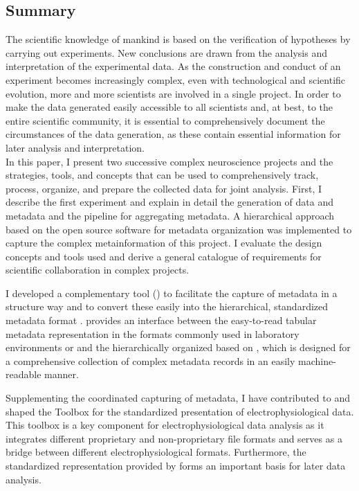 \clearpage
\thispagestyle{empty}
\subsection*{Summary}
\label{sec:summary}
The scientific knowledge of mankind is based on the verification of hypotheses by carrying out experiments. New conclusions are drawn from the analysis and interpretation of the experimental data. As the construction and conduct of an experiment becomes increasingly complex, even with technological and scientific evolution, more and more scientists are involved in a single project. In order to make the data generated easily accessible to all scientists and, at best, to the entire scientific community, it is essential to comprehensively document the circumstances of the data generation, as these contain essential information for later analysis and interpretation.\\

In this paper, I present two successive complex neuroscience projects and the strategies, tools, and concepts that can be used to comprehensively track, process, organize, and prepare the collected data for joint analysis. First, I describe the first experiment and explain in detail the generation of data and metadata and the pipeline for aggregating metadata. A hierarchical approach based on the open source software  for metadata organization was implemented to capture the complex metainformation of this project. I evaluate the design concepts and tools used and derive a general catalogue of requirements for scientific collaboration in complex projects.

I developed a complementary tool () to facilitate the capture of metadata in a structure way and to convert these easily into the hierarchical, standardized metadata format .  provides an interface between the easy-to-read tabular metadata representation in the formats commonly used in laboratory environments  or  and the hierarchically organized  based on , which is designed for a comprehensive collection of complex metadata records in an easily machine-readable manner.

Supplementing the coordinated capturing of metadata, I have contributed to and shaped the  Toolbox for the standardized presentation of electrophysiological data. This toolbox is a key component for electrophysiological data analysis as it integrates different proprietary and non-proprietary file formats and serves as a bridge between different electrophysiological formats. Furthermore, the standardized representation provided by  forms an important basis for later data analysis.

